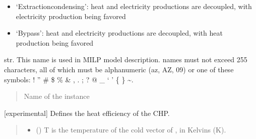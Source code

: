 \documentclass[letterpaper,10pt,english]{sphinxmanual}
\begin{document}
\begin{fulllineitems}
\begin{fulllineitems}
\begin{itemize}
\item {} 
\sphinxAtStartPar
‘Extraction\sphinxhyphen{}condensing’: heat and electricity productions are decoupled, with electricity production being favored

\item {} 
\sphinxAtStartPar
‘By\sphinxhyphen{}pass’: heat and electricity productions are decoupled, with heat production being favored

\end{itemize}

\end{fulllineitems}


\begin{fulllineitems}
\label{\detokenize{generated/tamos.production.CHP:tamos.production.CHP.name}}
\pysigstartsignatures
{}
\pysigstopsignatures
\sphinxAtStartPar
str.
This name is used in MILP model description.
names must not exceed 255 characters,
all of which must be alphanumeric (a\sphinxhyphen{}z, A\sphinxhyphen{}Z, 0\sphinxhyphen{}9) or one of these symbols:
! ” \# \$ \% \& , . ; ? @ \_ ‘ ’ \{ \} \textasciitilde{}.
\begin{quote}\begin{description}
\sphinxAtStartPar
Name of the instance

\end{description}\end{quote}

\end{fulllineitems}


\begin{fulllineitems}
\label{\detokenize{generated/tamos.production.CHP:tamos.production.CHP.set_heat_efficiency_model}}
\pysigstartsignatures
{}
\pysigstopsignatures
\sphinxAtStartPar
{[}experimental{]}
Defines the heat efficiency of the CHP.
\begin{quote}\begin{description}
\begin{itemize}
\item {} 
\sphinxAtStartPar
{} (\sphinxstyleliteralemphasis{\sphinxupquote{(}}\sphinxstyleliteralemphasis{\sphinxupquote{)}}) \textendash{} T is the temperature of the cold vector of , in Kelvins (K).


\end{itemize}
\end{description}
\end{quote}
\end{fulllineitems}
\end{fulllineitems}
\end{document}
